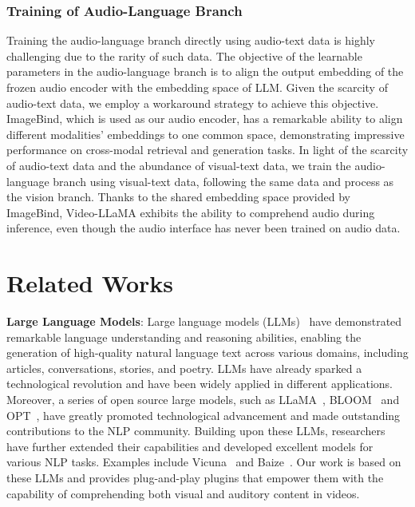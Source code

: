 \subsubsection{Training of Audio-Language Branch}
Training the audio-language branch directly using audio-text data is highly challenging due to the rarity of such data.  The objective of the learnable parameters in the audio-language branch is to align the output embedding of the frozen audio encoder with the embedding space of LLM. Given the scarcity of audio-text data, we employ a workaround strategy to achieve this objective.
ImageBind, which is used as our audio encoder, has a remarkable ability to align different modalities' embeddings to one common space, demonstrating impressive performance on cross-modal retrieval and generation tasks. 
In light of the scarcity of audio-text data and the abundance of visual-text data, we train the audio-language branch using visual-text data, following the same data and process as the vision branch.  Thanks to the shared embedding space provided by ImageBind, Video-LLaMA exhibits the ability to comprehend audio during inference, even though the audio interface has never been trained on audio data.

\section{Related Works}
\textbf{Large Language Models}: Large language models (LLMs)~\citep{black2022gpt, scao2022bloom, openai2023gpt4tr, tsimpoukelli2021multimodal} have demonstrated remarkable language understanding and reasoning abilities, enabling the generation of high-quality natural language text across various domains, including articles, conversations, stories, and poetry. LLMs have already sparked a technological revolution and have been widely applied in different applications. Moreover, a series of open source large models, such as LLaMA~\citep{touvron2023llama}, BLOOM~\citep{scao2022bloom} and OPT~\citep{zhang2022opt}, have greatly promoted technological advancement and made outstanding contributions to the NLP community. Building upon these LLMs, researchers have further extended their capabilities and developed excellent models for various NLP tasks. Examples include Vicuna~\citep{chiang2023vicuna} and Baize~\citep{xu2023baize}. Our work is based on these LLMs and provides plug-and-play plugins that empower them with the capability of comprehending both visual and auditory content in videos.

